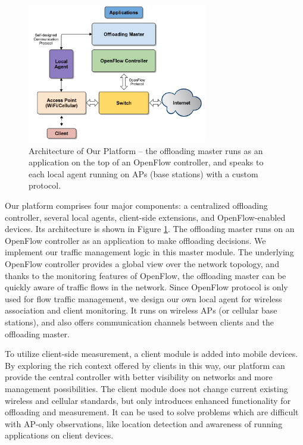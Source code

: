\documentclass[english]{tktltiki}
\begin{document}
\begin{figure}[htbp]
  \centering
  \includegraphics[width=0.7\textwidth]{images/architecture.png}
  \caption{Architecture of Our Platform -- the offloading master runs as an application on the top of an OpenFlow controller, and speaks to each local agent running on APs (base stations) with a custom protocol.}
  \label{fig:architecture}
\end{figure}

Our platform comprises four major components: a centralized offloading controller, several local agents, client-side extensions, and OpenFlow-enabled devices. Its architecture is shown in Figure \ref{fig:architecture}. The offloading master runs on an OpenFlow controller as an application to make offloading decisions. We implement our traffic management logic in this master module. The underlying OpenFlow controller provides a global view over the network topology, and thanks to the monitoring features of OpenFlow, the offloading master can be quickly aware of traffic flows in the network. Since OpenFlow protocol is only used for flow traffic management, we design our own local agent for wireless association and client monitoring. It runs on wireless APs (or cellular base stations), and also offers communication channels between clients and the offloading master.

To utilize client-side measurement, a client module is added into mobile devices. By exploring the rich context offered by clients in this way, our platform can provide the central controller with better visibility on networks and more management possibilities. The client module does not change current existing wireless and cellular standards, but only introduces enhanced functionality for offloading and measurement. It can be used to solve problems which are difficult with AP-only observations, like location detection and awareness of running applications on client devices.
\end{document}
